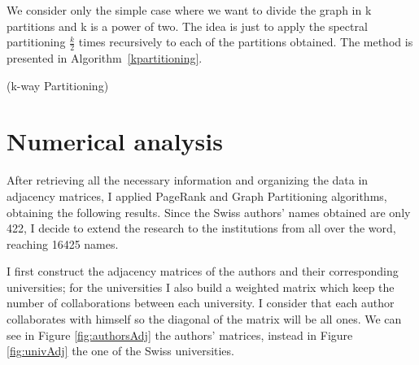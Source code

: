 \documentclass[]{usiinfbachelorproject}
\makeatletter
\def\BState{\State\hskip-\ALG@thistlm}
\makeatother
\begin{document}
We consider only the simple case where we want to divide the graph in k partitions and k is a power of two. The idea is just to apply the spectral partitioning $\frac{k}{2}$ times recursively to each of the partitions obtained. The method is presented in Algorithm~\ref{kpartitioning}.

\begin{algorithm}
\caption{ (k-way Partitioning)}\label{kpartitioning}
\end{algorithm}







\section{Numerical analysis}
After retrieving all the necessary information and organizing the data in adjacency matrices, I applied PageRank and Graph Partitioning algorithms, obtaining the following results.
Since the Swiss authors' names obtained are only 422, I decide to extend the research to the institutions from all over the word, reaching 16425 names. 

I first construct the adjacency matrices of the authors and their corresponding universities; for the universities I also build a weighted matrix which keep the number of collaborations between each university. I consider that each author collaborates with himself so the diagonal of the matrix will be all ones.
We can see in Figure \ref{fig:authorsAdj} the authors' matrices, instead in Figure \ref{fig:univAdj} the one of the Swiss universities.
\end{document}
